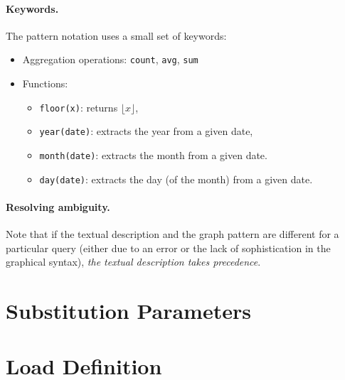 \newcommand{\tuple}[1]{\langle #1 \rangle}

\paragraph{Keywords.} The pattern notation uses a small set of keywords:

\begin{itemize}
	\item Aggregation operations: \lstinline{count}, \lstinline{avg}, \lstinline{sum}
	\item Functions:
	\begin{itemize}
		\item \lstinline{floor(x)}: returns $\lfloor x \rfloor$,
		\item \lstinline{year(date)}: extracts the year from a given date,
		\item \lstinline{month(date)}: extracts the month from a given date.
		\item \lstinline{day(date)}: extracts the day (of the month) from a given date.
	\end{itemize}
\end{itemize}

\paragraph{Resolving ambiguity.} Note that if the textual description and the graph pattern are different for a particular query (either due to an error or the lack of sophistication in the graphical syntax), \emph{the textual description takes precedence}.


\section{Substitution Parameters}




\section{Load Definition}


